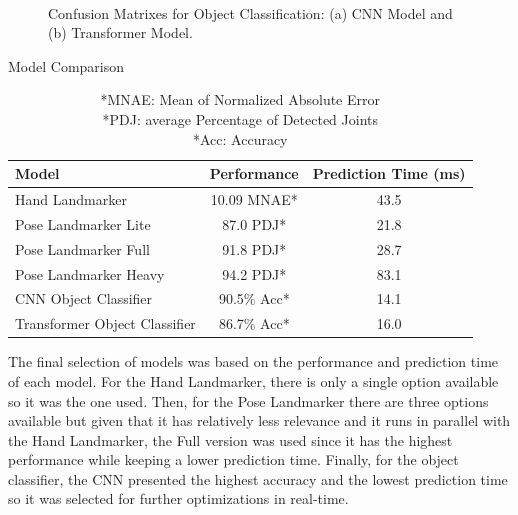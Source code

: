\begin{figure}[ht]
    \centering
    \begin{subfigure}[b]{0.49\textwidth}
        {\fontsize{10}{12}\selectfont}
        \caption{}
    \end{subfigure} \
    \begin{subfigure}[b]{0.49\textwidth}
        {\fontsize{10}{12}\selectfont}
        \caption{}
    \end{subfigure}
    \caption{Confusion Matrixes for Object Classification: (a) CNN Model and (b) Transformer Model.}
    \label{fig:confusion_matrixes}
\end{figure}

\begin{table}[H] %
    \centering
    \caption{Model Comparison}
    \label{table:model_comparison}
    \begin{tabular}{lcc}
        \toprule
        Model & Performance & Prediction Time (ms) \\
        \midrule
        Hand Landmarker & 10.09 MNAE* & 43.5 \\
        Pose Landmarker Lite & 87.0 PDJ* & 21.8 \\
        Pose Landmarker Full & 91.8 PDJ* & 28.7 \\
        Pose Landmarker Heavy & 94.2 PDJ* & 83.1 \\
        CNN Object Classifier & 90.5\% Acc* & 14.1 \\
        Transformer Object Classifier & 86.7\% Acc* & 16.0 \\
        \bottomrule
    \end{tabular}
    \captionsetup{width=0.9\textwidth}
    \caption*{*MNAE: Mean of Normalized Absolute Error\\ *PDJ: average Percentage of Detected Joints\\ *Acc: Accuracy}
\end{table}

The final selection of models was based on the performance and prediction time of each model. For the Hand Landmarker, there is only a single option available so it was the one used. Then, for the Pose Landmarker there are three options available but given that it has relatively less relevance and it runs in parallel with the Hand Landmarker, the Full version was used since it has the highest performance while keeping a lower prediction time. Finally, for the object classifier, the CNN presented the highest accuracy and the lowest prediction time so it was selected for further optimizations in real-time.

